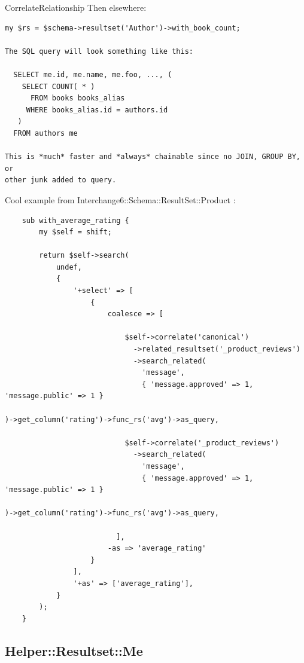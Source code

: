 \begin{frame}[fragile]{CorrelateRelationship}
Then elsewhere:

\begin{lstlisting}
my $rs = $schema->resultset('Author')->with_book_count;

The SQL query will look something like this:

  SELECT me.id, me.name, me.foo, ..., (
    SELECT COUNT( * )
      FROM books books_alias
     WHERE books_alias.id = authors.id
   )
  FROM authors me

This is *much* faster and *always* chainable since no JOIN, GROUP BY, or
other junk added to query.
\end{lstlisting}
\end{frame}

Cool example from Interchange6::Schema::ResultSet::Product :

\begin{lstlisting}
    sub with_average_rating {
        my $self = shift;

        return $self->search(
            undef,
            {
                '+select' => [
                    {
                        coalesce => [

                            $self->correlate('canonical')
                              ->related_resultset('_product_reviews')
                              ->search_related(
                                'message',
                                { 'message.approved' => 1,
'message.public' => 1 }
                             
)->get_column('rating')->func_rs('avg')->as_query,

                            $self->correlate('_product_reviews')
                              ->search_related(
                                'message',
                                { 'message.approved' => 1,
'message.public' => 1 }
                             
)->get_column('rating')->func_rs('avg')->as_query,

                          ],
                        -as => 'average_rating'
                    }
                ],
                '+as' => ['average_rating'],
            }
        );
    }
\end{lstlisting}

\subsection{Helper::Resultset::Me}

